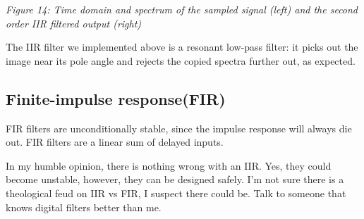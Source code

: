 {
\centering
{}
}

\emph{Figure 14: Time domain and spectrum of the sampled signal (left)
and the second order IIR filtered output (right)}

\begin{Shaded}
\begin{Highlighting}[]
\OperatorTok{=} 
\OperatorTok{=} 
\OperatorTok{=}\OperatorTok{+} \OperatorTok{*}
\OperatorTok{=}
\NormalTok{(} \OperatorTok{+} 
\OperatorTok{=}
 \NormalTok{(}
\OperatorTok{=}\OperatorTok{*}\NormalTok{x\_sn[i}\OperatorTok{{-}}\NormalTok{] }\OperatorTok{+} \OperatorTok{*}\OperatorTok{*}\NormalTok{y[i}\OperatorTok{{-}}\NormalTok{] }\OperatorTok{{-}}\OperatorTok{*}\OperatorTok{+}\OperatorTok{*}\OperatorTok{*}\NormalTok{y[i}\OperatorTok{{-}}\NormalTok{]}
\end{Highlighting}
\end{Shaded}

The IIR filter we implemented above is a resonant low-pass filter: it
picks out the image near its pole angle and rejects the copied spectra
further out, as expected.

\subsection{Finite-impulse
response(FIR)}\label{finite-impulse-responsefir}

FIR filters are unconditionally stable, since the impulse response will
always die out. FIR filters are a linear sum of delayed inputs.

In my humble opinion, there is nothing wrong with an IIR. Yes, they
could become unstable, however, they can be designed safely. I'm not
sure there is a theological feud on IIR vs FIR, I suspect there could
be. Talk to someone that knows digital filters better than me.

